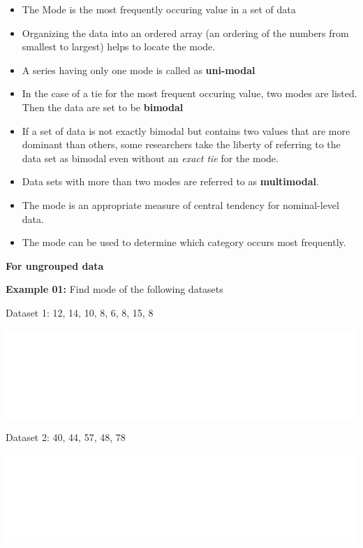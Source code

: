 \documentclass[]{book}
\begin{document}
\begin{itemize}
\item
  The Mode is the most frequently occuring value in a set of data
\item
  Organizing the data into an ordered array (an ordering of the numbers from smallest to largest) helps to locate the mode.
\item
  A series having only one mode is called as \textbf{uni-modal}
\item
  In the case of a tie for the most frequent occuring value, two modes are listed. Then the data are set to be \textbf{bimodal}
\item
  If a set of data is not exactly bimodal but contains two values that are more dominant than others, some researchers take the liberty of referring to the data set as bimodal even without an \emph{exact tie} for the mode.
\item
  Data sets with more than two modes are referred to as \textbf{multimodal}.
\item
  The mode is an appropriate measure of central tendency for nominal-level data.
\item
  The mode can be used to determine which category occurs most frequently.
\end{itemize}

\textbf{For ungrouped data}

\textbf{Example 01:} Find mode of the following datasets

Dataset 1: 12, 14, 10, 8, 6, 8, 15, 8

\begin{center}\includegraphics[width=1\linewidth]{figure/mode1-1} \end{center}

Dataset 2: 40, 44, 57, 48, 78

\begin{center}\includegraphics[width=1\linewidth]{figure/mode2-1} \end{center}
\end{document}

